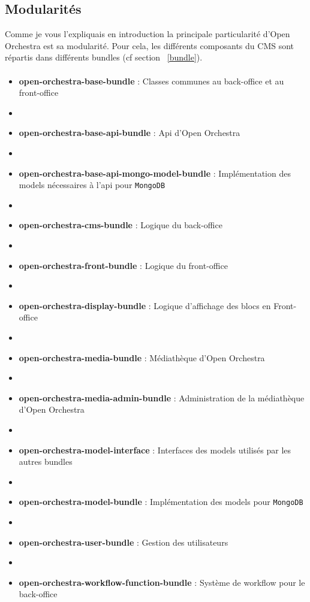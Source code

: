    \subsection{Modularités}
   Comme je vous l'expliquais en introduction la principale particularité d'Open Orchestra est sa modularité. Pour cela, les différents composants du CMS sont répartis dans différents bundles (cf section ~\ref{bundle}).
   \paragraph{}
   \begin{itemize}
   \item \textbf{open-orchestra-base-bundle} : Classes communes au back-office et au front-office
            \item[]
   \item \textbf{open-orchestra-base-api-bundle} : Api d'Open Orchestra
         \item[]   
   \item \textbf{open-orchestra-base-api-mongo-model-bundle} : Implémentation des models nécessaires à l'api pour \verb?MongoDB? 
            \item[]
   \item \textbf{open-orchestra-cms-bundle} : Logique du back-office
            \item[]
   \item \textbf{open-orchestra-front-bundle} : Logique du front-office
            \item[]
   \item \textbf{open-orchestra-display-bundle} : Logique d'affichage des blocs en Front-office
            \item[]
   \item \textbf{open-orchestra-media-bundle} : Médiathèque d'Open Orchestra
            \item[]
   \item \textbf{open-orchestra-media-admin-bundle} : Administration de la médiathèque d'Open Orchestra
            \item[]
   \item \textbf{open-orchestra-model-interface} : Interfaces des models utilisés par les autres bundles 
            \item[]
   \item \textbf{open-orchestra-model-bundle} : Implémentation des models pour \verb?MongoDB? 
            \item[]
   \item \textbf{open-orchestra-user-bundle} : Gestion des utilisateurs 
            \item[]
   \item \textbf{open-orchestra-workflow-function-bundle} : Système de workflow pour le back-office 
   \end{itemize}
